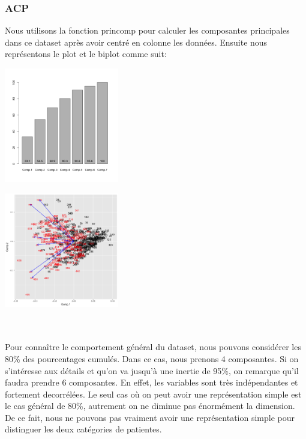 \documentclass[10pt]{article}
\begin{document}
\subsubsection{ACP}

Nous utilisons la fonction princomp pour calculer les composantes principales dans ce dataset après avoir centré en colonne les données. Ensuite nous représentons le plot et le biplot comme suit:
\\
\begin{minipage}{.5\textwidth}
	\centering
	\includegraphics[width=50mm]{Figures/Pima/barplot_inertie.png}
	\label{fig:pima_pca_plot}
\end{minipage}%
\hspace{0.08\linewidth}
\begin{minipage}{.5\textwidth}
	\centering
	\includegraphics[width=50mm]{Figures/Pima/pca_plot.png}
	\label{fig:pima_pca_biplot}
\end{minipage}
\\
\\
Pour connaître le comportement général du dataset, nous pouvons considérer les 80\% des pourcentages cumulés. Dans ce cas, nous prenons 4 composantes. Si on s'intéresse aux détails et qu'on va jusqu'à une inertie de 95\%, on remarque qu'il faudra prendre 6 composantes. En effet, les variables sont très indépendantes et fortement decorrélées. Le seul cas où on peut avoir une représentation simple est le cas général de 80\%, autrement on ne diminue pas énormément la dimension. De ce fait, nous ne pouvons pas vraiment avoir une représentation simple pour distinguer les deux catégories de patientes.
	
\end{document}
